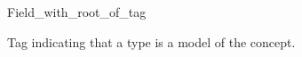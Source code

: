 \begin{ccRefClass}{Field_with_root_of_tag}
\label{Field_with_root_of_tag}

\ccDefinition
Tag indicating that a type is a model of the  concept. 


\ccInheritsFrom
{}

\ccIsModel
{}


\ccSeeAlso
{} \\
\\
\end{ccRefClass} 